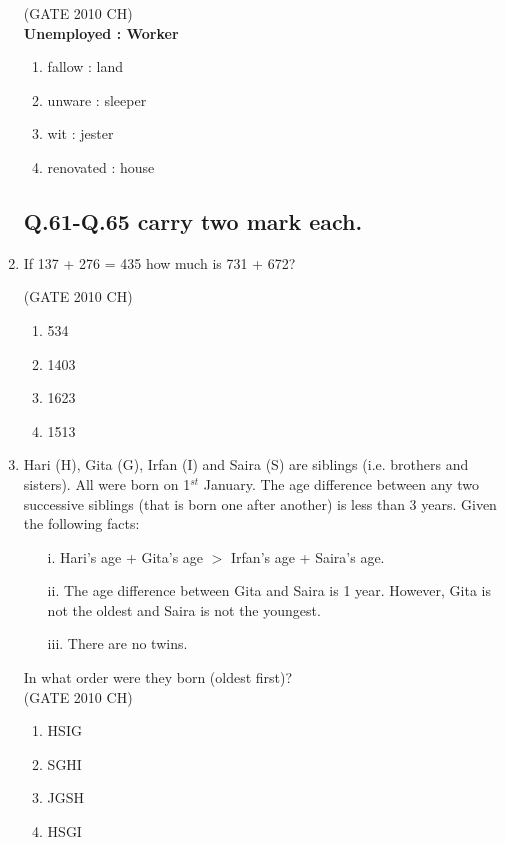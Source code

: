 \documentclass[journal,12pt,onecolumn]{exam}
\theoremstyle{remark}
\begin{document}
\begin{enumerate}
  \hfill{(GATE 2010 CH)}\\
  
  \textbf{Unemployed : Worker}

\begin{enumerate}
    \item fallow : land
    \item unware : sleeper
    \item wit : jester
    \item renovated : house
\end{enumerate}

\subsection{Q.61-Q.65 carry two mark each.}
\item 
 If 137 + 276 = 435 how much is 731 + 672?

\hfill{(GATE 2010 CH)}\\

 \begin{enumerate}
     \item 534
     \item 1403
     \item 1623
     \item 1513
 \end{enumerate}
\item
 Hari (H), Gita (G), Irfan (I) and Saira (S) are siblings (i.e. brothers and sisters). All were born on 1$^{st}$ January. The age difference between any two successive siblings (that is born one after another) is less than 3 years. Given the following facts:\\
\begin{itemize}
    \item[i.] Hari's age + Gita's age $>$ Irfan's age + Saira's age.
    \item[ii.] The age difference between Gita and Saira is 1 year. However, Gita is not the oldest and Saira is not the youngest.
    \item[iii.] There are no twins.
\end{itemize}
In what order were they born (oldest first)?\\

\hfill{(GATE 2010 CH)}\\
\begin{enumerate}
    \item HSIG 
    \item SGHI
    \item JGSH
    \item HSGI
\end{enumerate}


\end{enumerate}
\end{document}
